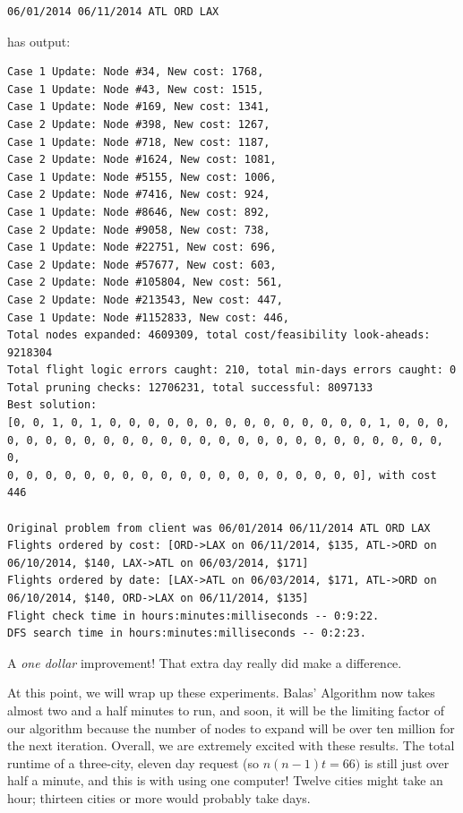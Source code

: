 \documentclass{article}
\begin{document}
\begin{verbatim}
06/01/2014 06/11/2014 ATL ORD LAX
\end{verbatim}

has output:

\scriptsize
\begin{verbatim}
Case 1 Update: Node #34, New cost: 1768, 
Case 1 Update: Node #43, New cost: 1515, 
Case 1 Update: Node #169, New cost: 1341, 
Case 2 Update: Node #398, New cost: 1267, 
Case 1 Update: Node #718, New cost: 1187, 
Case 2 Update: Node #1624, New cost: 1081, 
Case 1 Update: Node #5155, New cost: 1006, 
Case 2 Update: Node #7416, New cost: 924, 
Case 1 Update: Node #8646, New cost: 892, 
Case 2 Update: Node #9058, New cost: 738, 
Case 1 Update: Node #22751, New cost: 696, 
Case 2 Update: Node #57677, New cost: 603, 
Case 2 Update: Node #105804, New cost: 561, 
Case 2 Update: Node #213543, New cost: 447, 
Case 1 Update: Node #1152833, New cost: 446, 
Total nodes expanded: 4609309, total cost/feasibility look-aheads: 9218304
Total flight logic errors caught: 210, total min-days errors caught: 0
Total pruning checks: 12706231, total successful: 8097133
Best solution:
[0, 0, 1, 0, 1, 0, 0, 0, 0, 0, 0, 0, 0, 0, 0, 0, 0, 0, 0, 1, 0, 0, 0,
0, 0, 0, 0, 0, 0, 0, 0, 0, 0, 0, 0, 0, 0, 0, 0, 0, 0, 0, 0, 0, 0, 0, 0,
0, 0, 0, 0, 0, 0, 0, 0, 0, 0, 0, 0, 0, 0, 0, 0, 0, 0, 0], with cost 446

Original problem from client was 06/01/2014 06/11/2014 ATL ORD LAX
Flights ordered by cost: [ORD->LAX on 06/11/2014, $135, ATL->ORD on 06/10/2014, $140, LAX->ATL on 06/03/2014, $171]
Flights ordered by date: [LAX->ATL on 06/03/2014, $171, ATL->ORD on 06/10/2014, $140, ORD->LAX on 06/11/2014, $135]
Flight check time in hours:minutes:milliseconds -- 0:9:22.
DFS search time in hours:minutes:milliseconds -- 0:2:23.
\end{verbatim}
\normalsize

A \emph{one dollar} improvement! That extra day really did make a difference.

At this point, we will wrap up these experiments. Balas' Algorithm now takes almost two and a half minutes to run, and soon, it will be the limiting
factor of our algorithm because the number of nodes to expand will be over ten million for the next iteration. Overall, we are extremely excited with
these results.  The total runtime of a three-city, eleven day request (so $n(n-1)t = 66)$ is still just over half a minute, and this is with using one
computer! Twelve cities might take an hour; thirteen cities or more would probably take days.
\end{document}
